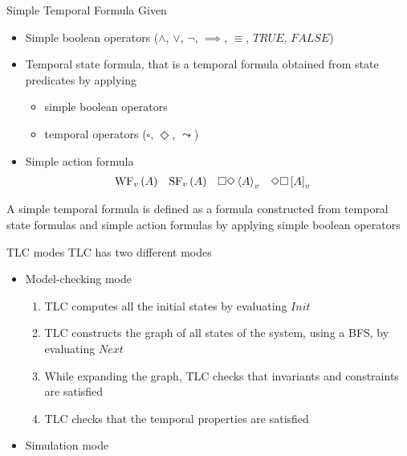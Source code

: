 \begin{frame}{Simple Temporal Formula}
    Given
    \begin{itemize}
        \item Simple boolean operators ($\land$, $\lor$, $\neg$, $\implies$, $\equiv$, $TRUE$, $FALSE$)
        \item Temporal state formula, that is a temporal formula obtained from state predicates by applying
        \begin{itemize}
            \item simple boolean operators
            \item temporal operators ($\square$, $\Diamond$, $\leadsto$)
        \end{itemize}
        \item Simple action formula\begin{align*}
            \textrm{WF}_v \left( A \right) &&
            \textrm{SF}_v \left( A \right) &&
            \square \Diamond \left< A \right>_v &&
            \Diamond \square \left[ A \right]_v &&
        \end{align*}
    \end{itemize}
    A simple temporal formula is defined as a formula constructed from temporal state formulas and simple action formulas by applying simple boolean operators
\end{frame}

\begin{frame}{TLC modes}
    TLC has two different modes
    \begin{itemize}
        \item<1,3> Model-checking mode
         {
            \begin{enumerate}
                \item TLC computes all the initial states by evaluating $Init$
                \item TLC constructs the graph of all states of the system, using a BFS, by evaluating $Next$
                \item While expanding the graph, TLC checks that invariants and constraints are satisfied
                \item TLC checks that the temporal properties are satisfied
            \end{enumerate}
        }
        \item<2-> Simulation mode
    \end{itemize}
\end{frame}
